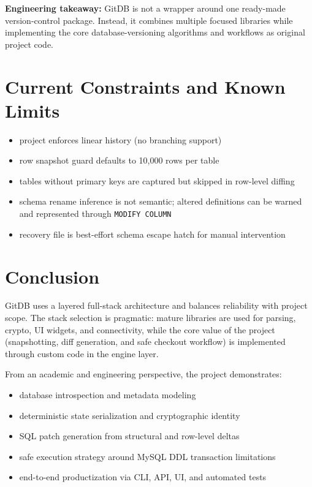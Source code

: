 \documentclass[12pt, a4paper]{article}
\begin{document}
\begin{tcolorbox}[fixbox]
\textbf{Engineering takeaway:}
GitDB is not a wrapper around one ready-made version-control package. Instead, it
combines multiple focused libraries while implementing the core database-versioning
algorithms and workflows as original project code.
\end{tcolorbox}

\section{Current Constraints and Known Limits}

\begin{itemize}[leftmargin=1.5em]
    \item project enforces linear history (no branching support)
    \item row snapshot guard defaults to 10,000 rows per table
    \item tables without primary keys are captured but skipped in row-level diffing
    \item schema rename inference is not semantic; altered definitions can be warned and
    represented through \texttt{MODIFY COLUMN}
    \item recovery file is best-effort schema escape hatch for manual intervention
\end{itemize}

\section{Conclusion}

GitDB uses a layered full-stack architecture and balances reliability with project
scope. The stack selection is pragmatic: mature libraries are used for parsing,
crypto, UI widgets, and connectivity, while the core value of the project
(snapshotting, diff generation, and safe checkout workflow) is implemented through
custom code in the engine layer.

From an academic and engineering perspective, the project demonstrates:
\begin{itemize}[leftmargin=1.5em]
    \item database introspection and metadata modeling
    \item deterministic state serialization and cryptographic identity
    \item SQL patch generation from structural and row-level deltas
    \item safe execution strategy around MySQL DDL transaction limitations
    \item end-to-end productization via CLI, API, UI, and automated tests
\end{itemize}
\end{document}
